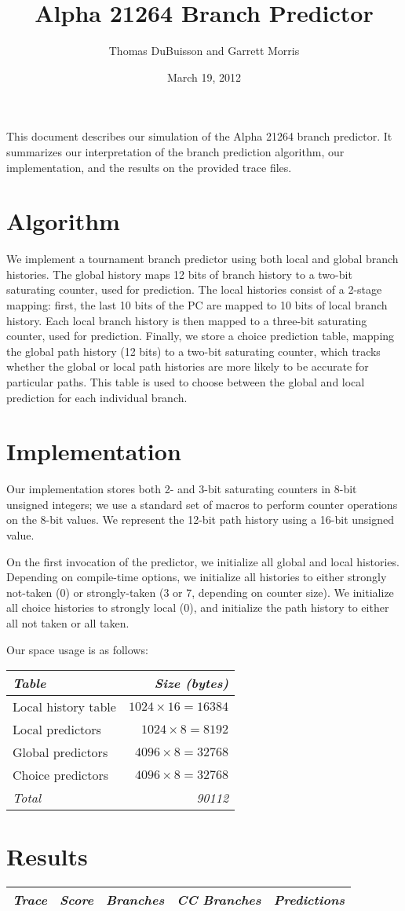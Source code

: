 \documentclass[11pt]{article}
\title{Alpha 21264 Branch Predictor}
\author{Thomas DuBuisson and Garrett Morris}
\date{March 19, 2012}
\begin{document}
\maketitle

This document describes our simulation of the Alpha 21264 branch predictor.  It summarizes our
interpretation of the branch prediction algorithm, our implementation, and the results on the
provided trace files.

\section{Algorithm}

We implement a tournament branch predictor using both local and global branch histories.  The global
history maps 12 bits of branch history to a two-bit saturating counter, used for prediction.  The
local histories consist of a 2-stage mapping: first, the last 10 bits of the PC are mapped to 10
bits of local branch history.  Each local branch history is then mapped to a three-bit saturating
counter, used for prediction.  Finally, we store a choice prediction table, mapping the global path
history (12 bits) to a two-bit saturating counter, which tracks whether the global or local path
histories are more likely to be accurate for particular paths.  This table is used to choose between
the global and local prediction for each individual branch.

\section{Implementation}

Our implementation stores both 2- and 3-bit saturating counters in 8-bit unsigned integers; we use a
standard set of macros to perform counter operations on the 8-bit values.  We represent the 12-bit
path history using a 16-bit unsigned value.

On the first invocation of the predictor, we initialize all global and local histories.  Depending
on compile-time options, we initialize all histories to either strongly not-taken (0) or
strongly-taken (3 or 7, depending on counter size).  We initialize all choice histories to strongly
local (0), and initialize the path history to either all not taken or all taken.

Our space usage is as follows:

\begin{tabular}{|l|r|}
\hline
\it Table & \it Size (bytes) \\
\hline
Local history table & $1024 \times 16 = 16384$ \\
Local predictors & $1024 \times 8 = 8192$ \\
Global predictors & $4096 \times 8 = 32768$ \\
Choice predictors & $4096 \times 8 = 32768$ \\
\it Total & \it 90112 \\
\hline
\end{tabular}

\section{Results}

\begin{tabular}{|l|rrrr|}
\hline
\it Trace & \it Score & \it Branches & \it CC Branches & \it Predictions \\
\hline

\hline
\end{tabular}
\end{document}
